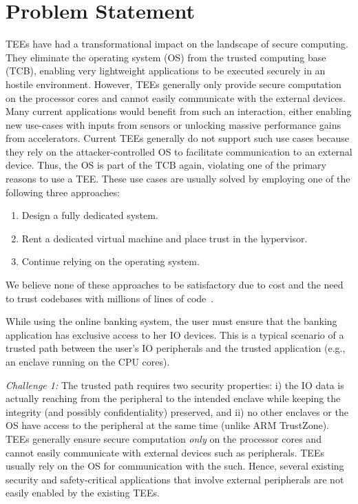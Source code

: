 \section{Problem Statement}
\label{sec:problemStatement}

TEEs have had a transformational impact on the landscape of secure computing. They eliminate the operating system (OS) from the trusted computing base (TCB), enabling very lightweight applications to be executed securely in an hostile environment. However, TEEs generally only provide secure computation on the processor cores and cannot easily communicate with the external devices. Many current applications would benefit from such an interaction, either enabling new use-cases with inputs from sensors or unlocking massive performance gains from accelerators. Current TEEs generally do not support such use cases because they rely on the attacker-controlled OS to facilitate communication to an external device. Thus, the OS is part of the TCB again, violating one of the primary reasons to use a TEE. 
These use cases are usually solved by employing one of the following three approaches: 
\begin{enumerate}
    \item Design a fully dedicated system.
    \item Rent a dedicated virtual machine and place trust in the hypervisor.
    \item Continue relying on the operating system.
\end{enumerate}
We believe none of these approaches to be satisfactory due to cost and the need to trust codebases with millions of lines of code~\cite{torvalds2020linux,barham2003xen}.


 While using the online banking system, the user must ensure that the banking application has exclusive access to her IO devices. This is a typical scenario of a trusted path between the user's IO peripherals and the trusted application (e.g., an enclave running on the CPU cores).

\emph{Challenge 1:} The trusted path requires two security properties: i) the IO data is actually reaching from the peripheral to the intended enclave while keeping the integrity (and possibly confidentiality) preserved, and ii) no other enclaves or the OS have access to the peripheral at the same time (unlike ARM TrustZone). TEEs generally ensure secure computation \emph{only} on the processor cores and cannot easily communicate with external devices such as peripherals. TEEs usually rely on the OS for communication with the such. Hence, several existing security and safety-critical applications that involve external peripherals are not easily enabled by the existing TEEs. 

